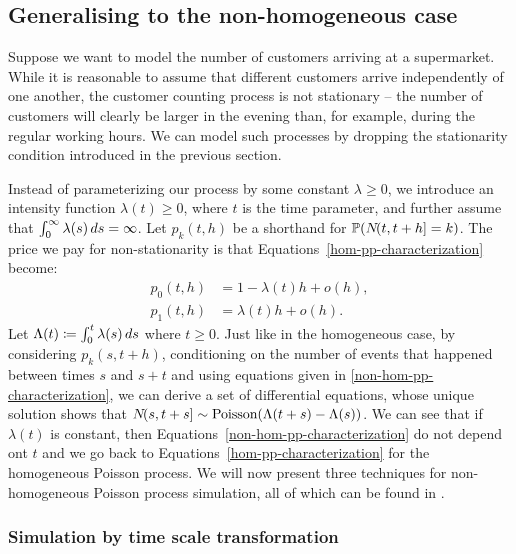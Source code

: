 \documentclass[report.tex]{subfiles}
\begin{document}
\subsection{Generalising to the non-homogeneous case}
\label{non-hom-pp-background}

Suppose we want to model the number of customers arriving at a supermarket.
While it is reasonable to assume that different customers arrive independently
of one another, the customer counting process is not stationary -- the number
of customers will clearly be larger in the evening than, for example, during
the regular working hours.
We can model such processes by dropping the stationarity condition introduced
in the previous section.

Instead of parameterizing our process by some constant $\lambda \geq 0$, we introduce
an intensity function $\lambda(t) \geq 0$, where $t$ is the time parameter, and
further assume that $\int_{{0}}^{{\infty}} {\lambda(s)}\, d{s} = \infty$.
Let $p_{k}(t, h)$ be a shorthand for $\mathbb{P}\!\left({{N}\!({t},{t+h}] = k}\right)$.
The price we pay for non-stationarity is that Equations~\ref{hom-pp-characterization}
become:
\begin{equation}
\begin{split}
  \label{non-hom-pp-characterization}
  p_{0}(t, h) &= 1 - \lambda(t) h + o(h), \\
  p_{1}(t, h) &= \lambda(t) h + o(h).
\end{split}
\end{equation}
Let $\Lambda(t) \coloneqq \int_{{0}}^{{t}} {\lambda(s)}\, d{s}$ where $t \geq 0$.
Just like in the homogeneous case, by considering $p_{k}(s, t + h)$,
conditioning on the number of events that happened between times $s$ and $s + t$
and using equations given in \ref{non-hom-pp-characterization},
we can derive a set of differential equations, whose unique solution shows that
${N}\!({s},{t+s}] \sim \text{Poisson}(\Lambda(t+s) - \Lambda(s))$.
We can see that if $\lambda(t)$ is constant, then Equations~\ref{non-hom-pp-characterization}
do not depend ont $t$ and we go back to Equations~\ref{hom-pp-characterization}
for the homogeneous Poisson process.
We will now present three techniques for non-homogeneous Poisson process simulation,
all of which can be found in \citet{devroye2013non}.

\subsubsection{Simulation by time scale transformation}
\end{document}
